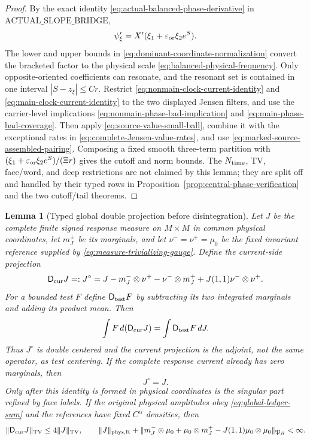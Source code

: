 \documentclass[11pt]{article}
\newtheorem{lemma}[theorem]{Lemma}
\begin{document}
\begin{proof}
By the exact identity \eqref{eq:actual-balanced-phase-derivative} in
$\mathrm{ACTUAL\_SLOPE\_BRIDGE}$,
\[
 \psi_\xi'=X'(\xi_1+\varepsilon_{\rm or}\xi_2e^S).
\]
The lower and upper bounds in
\eqref{eq:dominant-coordinate-normalization} convert the bracketed factor to
the physical scale \eqref{eq:balanced-physical-frequency}.  Only
opposite-oriented coefficients can resonate, and the resonant set is
contained in one interval $|S-z_\xi|\le Cr$.  Restrict
\eqref{eq:nonmain-clock-current-identity} and
\eqref{eq:main-clock-current-identity} to the two displayed Jensen filters,
and use the carrier-level implications
\eqref{eq:nonmain-phase-bad-implication} and
\eqref{eq:main-phase-bad-coverage}.  Then apply
\eqref{eq:source-value-small-ball}, combine it with the exceptional rates in
\eqref{eq:complete-Jensen-value-rates}, and use
\eqref{eq:marked-source-assembled-pairing}.  Composing a fixed smooth three-term
partition with
$(\xi_1+\varepsilon_{\rm or}\xi_2e^S)/(\Xi r)$ gives the cutoff and norm
bounds.  The $N_{\rm time}$, TV, face/word, and deep restrictions are not
claimed by this lemma; they are split off and handled by their typed rows in
Proposition~\ref{prop:central-phase-verification} and the two cutoff/tail
theorems.
\end{proof}
\begin{lemma}[Typed global double projection before disintegration]
\label{lem:global-label-recentering}
Let $J$ be the complete finite signed response measure on $M\times M$ in
common physical coordinates, let $m_J^\pm$ be its marginals, and let
$\nu^-=\nu^+=\mu_0$ be the fixed invariant reference supplied by
\eqref{eq:measure-trivializing-gauge}.  Define the
current-side projection
\begin{equation}
\label{eq:labelwise-recentering}
 \mathsf D_{\rm cur}J=:J^\circ
 =J-m_J^-\otimes\nu^+-\nu^-\otimes m_J^+
   +J(1,1)\nu^-\otimes\nu^+.
\end{equation}
For a bounded test $F$ define $\mathsf D_{\rm test}F$ by subtracting its two
integrated marginals and adding its product mean.  Then
\[
 \int F\,d(\mathsf D_{\rm cur}J)=
 \int \mathsf D_{\rm test}F\,dJ.
\]
Thus $J^\circ$ is double centered and the current projection is the adjoint,
not the same operator, as test centering.  If the complete response current
already has zero marginals, then
\begin{equation}
\label{eq:global-recentering-sum}
 J^\circ=J.
\end{equation}
Only after this identity is formed in physical coordinates is the singular
part refined by face labels.  If the original physical amplitudes obey
\eqref{eq:global-ledger-sum} and the references have fixed $C^\alpha$
densities, then
\begin{equation}
\label{eq:recenter-norm-ledger}
 \|\mathsf D_{\rm cur}J\|_{\rm TV}
 \le4\|J\|_{\rm TV},\qquad
 \|J\|_{\rm phys,R}
 +\|m_J^-\otimes\mu_0+\mu_0\otimes m_J^+
 -J(1,1)\mu_0\otimes\mu_0\|_{\mathfrak P_R}<\infty .
\end{equation}
\end{lemma}
\end{document}
